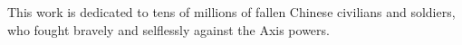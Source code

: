\begin{dedication}
This work is dedicated to tens of millions of fallen Chinese civilians and soldiers, who fought bravely and selflessly against the Axis powers.
\end{dedication}